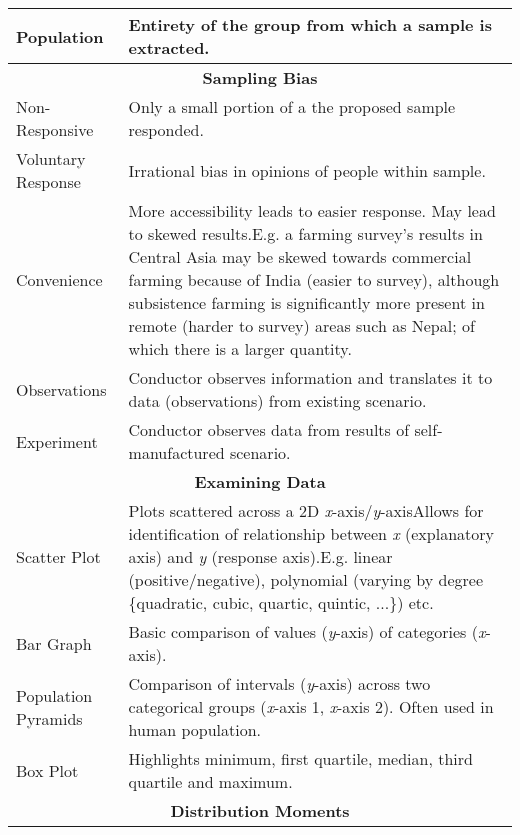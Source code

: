 \documentclass[11pt, english]{article}
\begin{document}
\begin{center}
\begin{longtable}{p{3cm}p{9cm}}
                Population & Entirety of the group from which a sample is extracted.\\
                \hline
                \multicolumn{2}{c}{\textbf{Sampling Bias}}\\
                \hline
		Non-Responsive & Only a small portion of a the proposed sample responded.\\
                Voluntary Response & Irrational bias in opinions of people within sample.\\
                Convenience & More accessibility leads to easier response. May lead to skewed results.\newline E.g. a farming survey's results in Central Asia may be skewed towards commercial farming because of India (easier to survey), although subsistence farming is significantly more present in remote (harder to survey) areas such as Nepal; of which there is a larger quantity.\\
                Observations & Conductor observes information and translates it to data (observations) from existing scenario.\\
                Experiment & Conductor observes data from results of self-manufactured scenario.\\
                \hline
                \hline
                \multicolumn{2}{c}{\textbf{Examining Data}}\\
                \hline
                \hline
                Scatter Plot & Plots scattered across a 2D \textit{x}-axis/\textit{y}-axis\newline Allows for identification of relationship between \textit{x} (explanatory axis) and \textit{y} (response axis).\newline E.g. linear (positive/negative), polynomial (varying by degree \{quadratic, cubic, quartic, quintic, ...\}) etc.\\
                Bar Graph & Basic comparison of values (\textit{y}-axis) of categories (\textit{x}-axis).\\
                Population Pyramids & Comparison of intervals (\textit{y}-axis) across two categorical groups (\textit{x}-axis 1, \textit{x}-axis 2). Often used in human population.\\
                Box Plot & Highlights minimum, first quartile, median, third quartile and maximum.\\
                \hline
                \multicolumn{2}{c}{\textbf{Distribution Moments}}\\
                \hline

\end{longtable}
\end{center}
\end{document}
